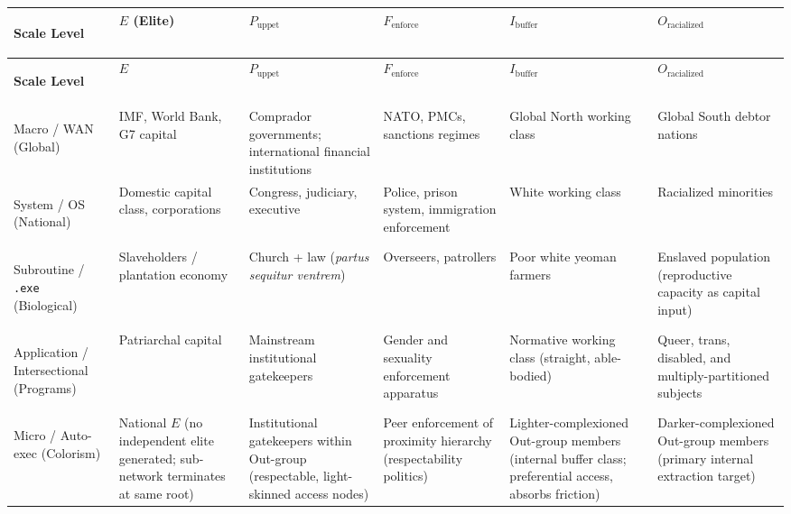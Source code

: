 \begin{longtable}{>{\bfseries\raggedright}p{2.3cm} >{\raggedright}p{2.0cm} >{\raggedright}p{2.0cm} >{\raggedright}p{2.2cm} >{\raggedright}p{2.2cm} >{\raggedright\arraybackslash}p{2.3cm}}
\toprule
\textbf{Scale Level} & \textbf{$E$ (Elite)} & \textbf{$P_{\text{uppet}}$} & \textbf{$F_{\text{enforce}}$} & \textbf{$I_{\text{buffer}}$} & \textbf{$O_{\text{racialized}}$} \\
\midrule
\endfirsthead
\toprule
\textbf{Scale Level} & \textbf{$E$} & \textbf{$P_{\text{uppet}}$} & \textbf{$F_{\text{enforce}}$} & \textbf{$I_{\text{buffer}}$} & \textbf{$O_{\text{racialized}}$} \\
\midrule
\endhead
Macro / WAN (Global) &
IMF, World Bank, G7 capital &
Comprador governments; international financial institutions &
NATO, PMCs, sanctions regimes &
Global North working class &
Global South debtor nations \\
\midrule
System / OS (National) &
Domestic capital class, corporations &
Congress, judiciary, executive &
Police, prison system, immigration enforcement &
White working class &
Racialized minorities \\
\midrule
Subroutine / \texttt{.exe} (Biological) &
Slaveholders / plantation economy &
Church + law (\textit{partus sequitur ventrem}) &
Overseers, patrollers &
Poor white yeoman farmers &
Enslaved population (reproductive capacity as capital input) \\
\midrule
Application / Intersectional (Programs) &
Patriarchal capital &
Mainstream institutional gatekeepers &
Gender and sexuality enforcement apparatus &
Normative working class (straight, able-bodied) &
Queer, trans, disabled, and multiply-partitioned subjects \\
\midrule
Micro / Auto-exec (Colorism) &
National $E$ (no independent elite generated; sub-network terminates at same root) &
Institutional gatekeepers within Out-group (respectable, light-skinned access nodes) &
Peer enforcement of proximity hierarchy (respectability politics) &
Lighter-complexioned Out-group members (internal buffer class; preferential access, absorbs friction) &
Darker-complexioned Out-group members (primary internal extraction target) \\
\bottomrule
\end{longtable}

